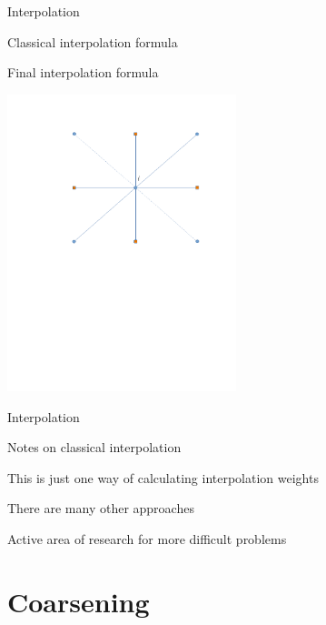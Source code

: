 \documentclass[18pt,xcolor=table]{beamer}
\begin{document}
\begin{frame}{Interpolation}
\begin{block}{Classical interpolation formula}
\bit
\item Final interpolation formula
\eit
\end{block}
\begin{center}
\includegraphics[width=0.5\textwidth]{../figures/interpStencilCpts}
\end{center}
\end{frame}

\begin{frame}{Interpolation}
\begin{block}{Notes on classical interpolation}
\bit
\item This is just one way of calculating interpolation weights
\item There are many other approaches
\item Active area of research for more difficult problems
\eit
\end{block}
\end{frame}


\section{Coarsening}

\begin{frame}{}
\begin{block}{}
\bit
\item 
\eit
\end{block}
\end{frame}
\end{document}
